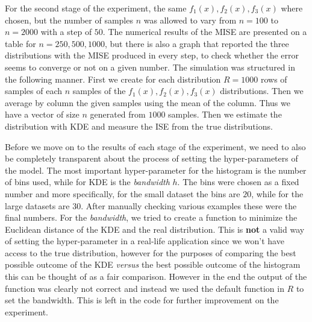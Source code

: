 \documentclass[fleqn, a4paper]{report}
\begin{document}
For the second stage of the experiment, the same $f_1(x), f_2(x), f_3(x)$ where chosen, but the number of samples $n$ was allowed to vary from $n=100$ to $n=2000$ with a step of $50$. The numerical results of the MISE are presented on a table for $n=250,500,1000$, but there is also a graph that reported the three distributions with the MISE produced in every step, to check whether the error seems to converge or not on a given number. The simulation was structured in the following manner. First we create for each distribution $R=1000$ rows of samples of each $n$ samples of the $f_1(x), f_2(x), f_3(x)$ distributions. Then we average by column the given samples using the mean of the column. Thus we have a vector of size $n$ generated from $1000$ samples. Then we estimate the distribution with KDE and measure the ISE from the true distributions. 

Before we move on to the results of each stage of the experiment, we need to also be completely transparent about the process of setting the hyper-parameters of the model. The most important hyper-parameter for the histogram is the number of bins used, while for KDE is the \textit{bandwidth} $h$. The bins were chosen as a fixed number and more specifically, for the small dataset the bins are $20$, while for the large datasets are $30$. After manually checking various examples these were the final numbers. For the \textit{bandwidth}, we tried to create a function to minimize the Euclidean distance of the KDE and the real distribution. This is \textbf{not} a valid way of setting the hyper-parameter in a real-life application since we won't have access to the true distribution, however for the purposes of comparing the best possible outcome of the KDE \textit{versus} the best possible outcome of the histogram this can be thought of as a fair comparison. However in the end the output of the function was clearly not correct and instead we used the default function in $R$ to set the bandwidth. This is left in the code for further improvement on the experiment. 
\end{document}
